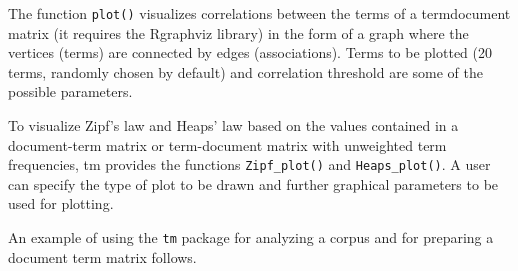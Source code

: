 The function \texttt{plot()} visualizes correlations between the terms of a termdocument matrix (it requires the Rgraphviz library) in the form of a graph where
the vertices (terms) are connected by edges (associations). Terms to be plotted
(20 terms, randomly chosen by default) and correlation threshold are some of the
possible parameters.

To visualize Zipf’s law and Heaps’ law based on the values contained in a
document-term matrix or term-document matrix with unweighted term frequencies, tm provides the functions \texttt{Zipf\_plot()} and \texttt{Heaps\_plot()}. A user can
specify the type of plot to be drawn and further graphical parameters to be used
for plotting.

An example of using the \texttt{tm} package for analyzing a corpus and for preparing
a document term matrix follows.

